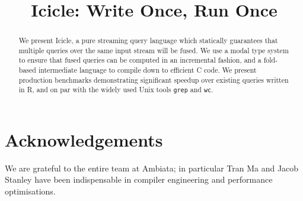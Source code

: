 \documentclass[preprint]{sigplanconf}
\begin{document}
\toappear{}


\title{Icicle: Write Once, Run Once}


\maketitle
\makeatactive

\begin{abstract}
We present Icicle, a pure streaming query language which statically guarantees that multiple queries over the same input stream will be fused. We use a modal type system to ensure that fused queries can be computed in an incremental fashion, and a fold-based intermediate language to compile down to efficient C code. We present production benchmarks demonstrating significant speedup over existing queries written in R, and on par with the widely used Unix tools \texttt{grep} and \texttt{wc}.

\end{abstract}

% 








\section*{Acknowledgements}
We are grateful to the entire team at Ambiata; in particular Tran Ma and Jacob Stanley have been indispensable in compiler engineering and performance optimisations.



\end{document}
